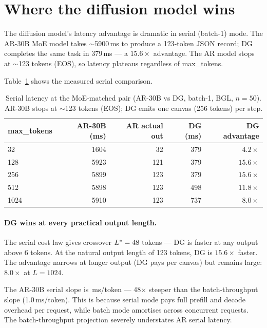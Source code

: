 \section{Where the diffusion model wins}
\label{sec:wins}

The diffusion model's latency advantage is dramatic in serial
(batch-1) mode. The AR-30B MoE model takes $\sim$5900\,ms to
produce a 123-token JSON record; DG completes the same task in
379\,ms --- a $15.6\times$ advantage. The AR model stops at
$\sim$123 tokens (EOS), so latency plateaus regardless of
max\_tokens.

Table~\ref{tab:niche} shows the measured serial comparison.

\begin{table}[h]
\centering
\caption{Serial latency at the MoE-matched pair (AR-30B vs DG, batch-1,
BGL, $n{=}50$). AR-30B stops at $\sim$123 tokens (EOS); DG emits one
canvas (256 tokens) per step.}
\label{tab:niche}
\begin{tabular}{@{}lrrrr@{}}
\toprule
max\_tokens & AR-30B (ms) & AR actual out & DG (ms) & DG advantage \\
\midrule
32   & 1604 & 32  & 379 & $4.2\times$ \\
128  & 5923 & 121 & 379 & $15.6\times$ \\
256  & 5899 & 123 & 379 & $15.6\times$ \\
512  & 5898 & 123 & 498 & $11.8\times$ \\
1024 & 5910 & 123 & 737 & $8.0\times$ \\
\bottomrule
\end{tabular}
\end{table}

\paragraph{DG wins at every practical output length.}

The serial cost law gives crossover $L^{*} = 48$ tokens --- DG
is faster at any output above 6 tokens. At the natural output length
of 123 tokens, DG is $15.6\times$ faster. The advantage narrows at
longer output (DG pays per canvas) but remains large: $8.0\times$ at
$L{=}1024$.

The AR-30B serial slope is \arSlope\,ms/token --- 48$\times$ steeper
than the batch-throughput slope (1.0\,ms/token). This is because
serial mode pays full prefill and decode overhead per request, while
batch mode amortises across concurrent requests. The batch-throughput
projection severely understates AR serial latency.

